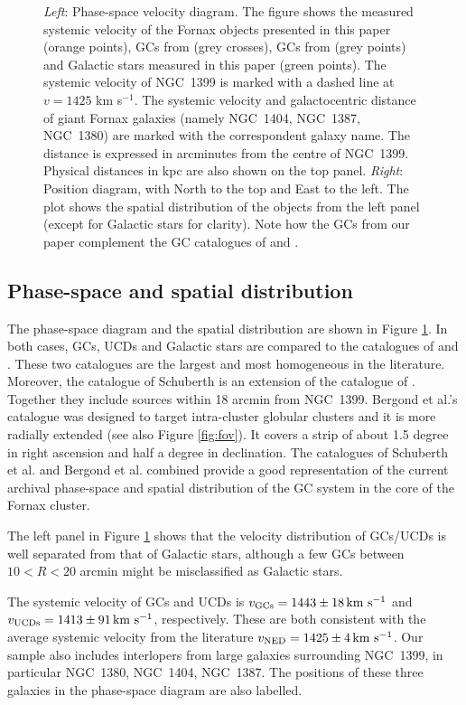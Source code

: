 \documentclass[usenatbib]{mnras}
\newcommand{\kms}{\mbox{\,km~s$^{-1}$}}
\begin{document}
\begin{figure}
\caption{\textit{Left}: Phase-space velocity diagram. The figure shows the 
measured systemic velocity of the Fornax objects presented in this paper 
(orange points), GCs from \citet{Schuberth} (grey crosses), GCs from 
\citet{Bergond07} (grey points) and Galactic stars measured in this paper 
(green points). The systemic velocity of NGC~1399 is marked with a dashed line 
at $v = 1425$ km s$^{-1}$. The systemic velocity and galactocentric distance of 
giant Fornax galaxies (namely NGC~1404, NGC~1387, NGC~1380) are marked with 
the correspondent galaxy name.  The distance is expressed in 
arcminutes from the centre of NGC~1399. 
Physical distances in kpc are also shown on the top panel. 
\textit{Right}: Position diagram, with North to the top and East to the left. 
The plot shows the spatial distribution of the objects from the left panel 
(except for Galactic stars for clarity). Note how the GCs from our paper complement the GC 
catalogues of \citet{Schuberth} and \citet{Bergond07}. }
\label{fig:phase-space}
\end{figure}

\subsection{Phase-space and spatial distribution}

The phase-space diagram and the spatial distribution are shown in Figure 
\ref{fig:phase-space}. In both cases, GCs, UCDs and Galactic stars are compared 
to the catalogues of \citet{Bergond07} and \citet{Schuberth}. These two 
catalogues are the largest and most homogeneous in the literature. 
Moreover, 
the catalogue of Schuberth is an extension of the catalogue of 
\citet{Dirsch04}. Together they include sources within 18 arcmin from NGC~1399. 
Bergond et al.'s catalogue was designed to target intra-cluster globular clusters and 
it is more radially extended (see also Figure \ref{fig:fov}). It covers a strip 
of about 1.5 degree in right ascension and half a degree in declination. The 
catalogues of Schuberth et al. and Bergond et al. combined provide a good representation of 
the current archival phase-space and spatial distribution of the GC system in 
the core of the Fornax cluster. 

The left panel in Figure \ref{fig:phase-space} shows that the velocity 
distribution of GCs/UCDs is well separated from that of Galactic stars, 
although a few GCs between $10<R<20$ arcmin 
might be misclassified as Galactic stars. 

The systemic velocity of GCs and UCDs is $v_{\rm GCs} = 1443 \pm 18 \kms$ and 
$v_{\rm UCDs} = 1413 \pm 91 \kms$, respectively. These are both consistent with 
the average systemic velocity from the literature $v_{\rm NED} = 1425 \pm 4 
\kms$. Our sample also includes interlopers from large galaxies surrounding 
NGC~1399, in particular NGC~1380, NGC~1404, NGC~1387. The positions of these 
three galaxies in the phase-space diagram are also labelled. 
\end{document}
